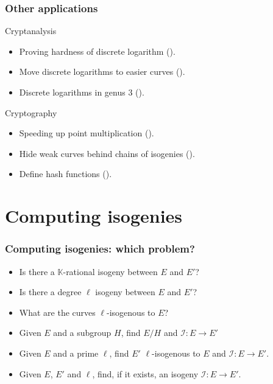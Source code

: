 \documentclass[10pt]{beamer}
\newcommand{\blue}[1]{\textcolor{blue}{#1}}  %
\newcommand{\K}{\mathbb{K}}  %
\newcommand{\0}{\mathcal{O}}  %
\newcommand{\isog}[1]{\mathcal{#1}}  %
\newcommand{\I}{\isog{I}}  %
\begin{document}
\begin{frame}
  \frametitle{Other applications}
  
  \begin{block}{Cryptanalysis}
    \begin{itemize}
    \item Proving hardness of discrete logarithm (\cite{JMV05}).
    \item Move discrete logarithms to easier curves (\cite{GHS}).
    \item Discrete logarithms in genus $3$ (\cite{Ben}).
    \end{itemize}
  \end{block}
  
  \begin{block}{Cryptography}
    \begin{itemize}
    \item Speeding up point multiplication (\cite{GLV}).
    \item Hide weak curves behind chains of isogenies (\cite{Tes06}).
    \item Define hash functions (\cite{CLG09}).
    \end{itemize}
  \end{block}
\end{frame}


\section{Computing isogenies}

\begin{frame}
  \frametitle{Computing isogenies: which problem?}
  
  \begin{itemize}
  \setlength{\itemsep}{1em}
  \item Is there a $\K$-rational isogeny between $E$ and $E'$?
    \hfill\only<2->{\blue{$\Leftrightarrow \#E(\K) = \#E'(\K)$}}
  \item Is there a degree $\ell$ isogeny between $E$ and $E'$?
    \hfill\only<2->{\blue{$\Leftrightarrow \Phi_\ell(j(E), j(E')) = 0$}}
  \item What are the curves $\ell$-isogenous to $E$?
    \hfill\only<2->{\blue{factor $\Phi_\ell(j(E), Y)$}}
  \item Given $E$ and a subgroup $H$, find $E/H$ and $\I:E\rightarrow
    E'$ \hfill\only<2->{\blue{Vélu formulae}}
  \item Given $E$ and a prime $\ell$, find $E'$ $\ell$-isogenous to
    $E$ and $\I:E\rightarrow E'$.
  \item \alert<3>{Given $E$, $E'$ and $\ell$, find, if it exists, an isogeny
    $\I:E\rightarrow E'$.}
  \end{itemize}

  \smallskip
  \begin{center}
  \end{center}

\end{frame}
\end{document}
